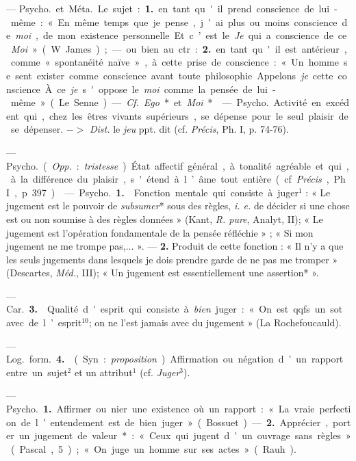 
	\begin{itemize}[leftmargin=1cm, label=, itemsep=1pt]
	
 — \si{Psycho.} et \si{Méta.} Le sujet : {\bf 1.} en tant qu'il prend
conscience de lui-même : « En même temps que je pense, j'ai plus ou moins
conscience de {\it moi}, de mon existence personnelle. Et c’est le {\it Je}
qui a conscience de ce {\it Moi} » (W. James) ; — ou bien au ctr. : {\bf 2.}
en tant qu'il est antérieur, comme « spontanéité naïve », à cette prise de
conscience : « Un homme se sent exister comme conscience avant toute
philosophie... Appelons {\it je} cette conscience... À ce {\it je} s'oppose le
{\it moi} comme la pensée de lui-même » (Le Senne). — {\it Cf.} {\it Ego}* et
{\it Moi}*.

 — \si{Psycho.} Activité en excédent qui, chez les êtres
vivants supérieurs, se dépense pour le seul plaisir de se dépenser. $->$
{\it Dist.} le {\it jeu} ppt. dit (cf. {\it Précis}, Ph. I, p. 74-76).

 — \si{Psycho.} ({\it Opp.} : {\it tristesse}). État affectif
général, à tonalité agréable et qui, à la différence du plaisir, s'étend à
l’âme tout entière (cf. {\it Précis}, Ph. I, p. 397).

 — \si{Psycho.} {\bf 1.}  Fonction mentale qui
consiste à juger$^1$ : « Le jugement est le pouvoir de {\it subsumer}* sous
des règles, {\it i. e.} de décider si une chose est ou non soumise à des
règles données » (Kant, {\it R. pure}, Analyt, II); « Le jugement est
l’opération fondamentale de la pensée réfléchie » ; « Si mon jugement ne me
trompe pas,... ». —  {\bf 2.}  Produit de cette fonction : « Il
n’y a que les seuls jugements dans lesquels je dois prendre garde de ne pas me
tromper » (Descartes, {\it Méd.}, III); « Un jugement est essentiellement une
assertion* ».

— \si{Car.} {\bf 3.}  Qualité d'esprit qui consiste à
{\it bien} juger : « On est qqfs. un sot avec de l’esprit$^{10}$; on ne l’est
jamais avec du jugement » (La Rochefoucauld).

— \si{Log.} \si{form.} {\bf 4.}  (Syn. : {\it proposition}).
Affirmation ou négation d’un rapport entre un sujet$^2$ et un attribut$^1$
(cf. {\it Juger}$^3$).

 — \si{Psycho.} {\bf 1.} Affirmer ou nier une existence où un
rapport : « La vraie perfection de l’entendement est de bien
juger » (Bossuet). — {\bf 2.} Apprécier, porter un jugement de valeur* :
« Ceux qui jugent d'un ouvrage sans règles... » (Pascal, 5) ; « On juge un
homme sur ses actes » (Rauh).


\end{itemize}

